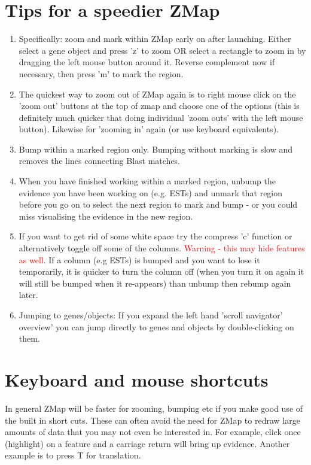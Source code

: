 \documentclass[letterpaper]{article}
\begin{document}
\section{Tips for a speedier ZMap}
\begin{enumerate}
\item Specifically: zoom and mark within ZMap early on after launching. Either select a gene object and press 'z' to zoom OR select a rectangle to zoom in by dragging the left mouse button around it. Reverse complement now if necessary, then press 'm' to mark the region.
\item The quickest way to zoom out of ZMap again is to right mouse click on the 'zoom out' buttons at the top of zmap and choose one of the options (this is definitely much quicker that doing individual 'zoom outs' with the left mouse button). Likewise for 'zooming in' again (or use keyboard equivalents).
\item Bump within a marked region only. Bumping without marking is slow and removes the lines connecting Blast matches.
\item When you have finished working within a marked region, unbump the evidence you have been working on (e.g. ESTs) and unmark that region before you go on to select the next region to mark and bump - or you could miss visualising the evidence in the new region.
\item If you want to get rid of some white space try the compress 'c' function or alternatively toggle off some of the columns. \textcolor{red}{Warning - this may hide features as well}. If a column (e.g ESTs) is bumped and you want to lose it temporarily, it is quicker to turn the column off (when you turn it on again it will still be bumped when it re-appears) than unbump then rebump again later.
\item Jumping to genes/objects: If you expand the left hand 'scroll navigator' overview' you can jump directly to genes and objects by double-clicking on them.
\end{enumerate}


\clearpage
\section{Keyboard and mouse shortcuts}
In general ZMap will be faster for zooming, bumping etc if you make good use of the built in short cuts. These can often avoid the need for ZMap to redraw large amounts of data that you may not even be interested in. For example, click once (highlight) on a feature and a carriage return will bring up evidence. Another example is to press T for translation.
\end{document}
